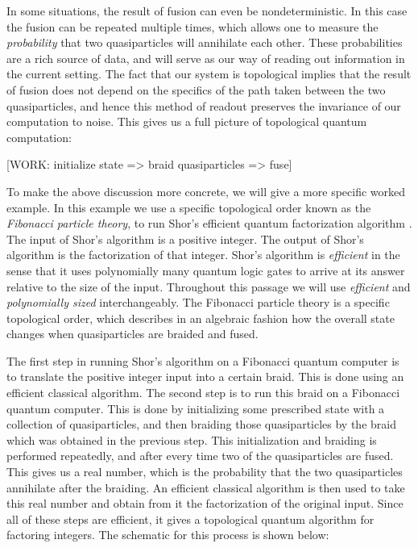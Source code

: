 \documentclass{article}
\theoremstyle{definition}
\numberwithin{figure}{section}
\begin{document}
In some situations, the result of fusion can even be nondeterministic. In this case the fusion can be repeated multiple times, which allows one to measure the \textit{probability} that two quasiparticles will annihilate each other. These probabilities are a rich source of data, and will serve as our way of reading out information in the current setting. The fact that our system is topological implies that the result of fusion does not depend on the specifics of the path taken between the two quasiparticles, and hence this method of readout preserves the invariance of our computation to noise. This gives us a full picture of topological quantum computation:

[WORK: initialize state => braid quasiparticles => fuse]

To make the above discussion more concrete, we will give a more specific worked example. In this example we use a specific topological order known as the \textit{Fibonacci particle theory}, to run Shor’s efficient quantum factorization algorithm \cite{shor1994algorithms}. The input of Shor’s algorithm is a positive integer. The output of Shor’s algorithm is the factorization of that integer. Shor’s algorithm is \textit{efficient} in the sense that it uses polynomially many quantum logic gates to arrive at its answer relative to the size of the input. Throughout this passage we will use \textit{efficient} and \textit{polynomially sized} interchangeably. The Fibonacci particle theory is a specific topological order, which describes in an algebraic fashion how the overall state changes when quasiparticles are braided and fused.

The first step in running Shor’s algorithm on a Fibonacci quantum computer is to translate the positive integer input into a certain braid. This is done using an efficient classical algorithm. The second step is to run this braid on a Fibonacci quantum computer. This is done by initializing some prescribed state with a collection of quasiparticles, and then braiding those quasiparticles by the braid which was obtained in the previous step. This initialization and braiding is performed repeatedly, and after every time two of the quasiparticles are fused. This gives us a real number, which is the probability that the two quasiparticles annihilate after the braiding. An efficient classical algorithm is then used to take this real number and obtain from it the factorization of the original input. Since all of these steps are efficient, it gives a topological quantum algorithm for factoring integers. The schematic for this process is shown below:
\end{document}
